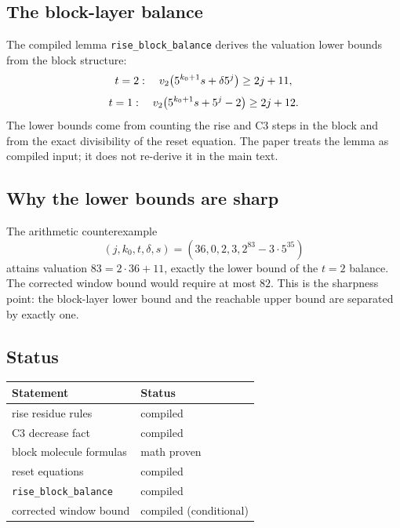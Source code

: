 \subsection{The block-layer balance}

The compiled lemma \texttt{rise\_\allowbreak block\_\allowbreak balance}
derives the valuation lower bounds from the block structure:
\begin{equation*}
  t=2:\quad
  v_2\!\left(5^{k_0+1}s+\delta5^j\right)\ge2j+11,
\end{equation*}
\begin{equation*}
  t=1:\quad
  v_2\!\left(5^{k_0+1}s+5^j-2\right)\ge2j+12.
\end{equation*}
The lower bounds come from counting the rise and C3 steps in the
block and from the exact divisibility of the reset equation.  The
paper treats the lemma as compiled input; it does not re-derive it in
the main text.

\subsection{Why the lower bounds are sharp}

The arithmetic counterexample
\begin{equation*}
  (j,k_0,t,\delta,s)=(36,0,2,3,2^{83}-3\cdot5^{35})
\end{equation*}
attains valuation $83=2\cdot36+11$, exactly the lower bound of the
$t=2$ balance.  The corrected window bound would require at most
$82$.  This is the sharpness point: the block-layer lower bound and
the reachable upper bound are separated by exactly one.

\subsection{Status}

\begin{center}
\small
\begin{tabular}{@{}p{}p{}@{}}
\toprule
Statement & Status \\
\midrule
rise residue rules & compiled \\
C3 decrease fact & compiled \\
block molecule formulas & math proven \\
reset equations & compiled \\
\texttt{rise\_\allowbreak block\_\allowbreak balance} & compiled \\
corrected window bound & compiled (conditional) \\
\bottomrule
\end{tabular}
\end{center}
